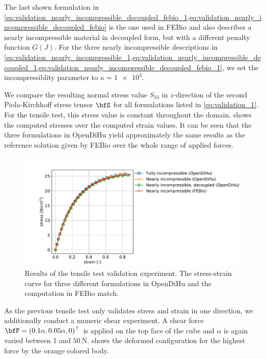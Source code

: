 The last shown formulation in \cref{eq:validation_nearly_incompressible_decoupled_febio_1,eq:validation_nearly_incompressible_decoupled_febio} is the one used in FEBio and also describes a nearly incompressible material in decoupled form, but with a different penalty function $G(J)$.  
For the three nearly incompressible descriptions in \cref{eq:validation_nearly_incompressible_1,eq:validation_nearly_incompressible_decoupled_1,eq:validation_nearly_incompressible_decoupled_febio_1}, we set the incompressiblity parameter to $\kappa=\num{1e3}$.

We compare the resulting normal stress value $S_{33}$ in $z$-direction of the second Piola-Kirchhoff stress tensor $\bfS$ for all formulations listed in \cref{eq:validation_1}. For the tensile test, this stress value is constant throughout the domain.  shows the computed stresses over the computed strain values.
It can be seen that the three formulations in OpenDiHu yield approximately the same results as the reference solution given by FEBio over the whole range of applied forces.

\begin{figure}
  \centering%
  \includegraphics[width=\textwidth]{images/results/basic/validation_tensile_test.pdf}%
  \caption{Results of the tensile test validation experiment. The stress-strain curve for three different formulations in OpenDiHu and the computation in FEBio match.}%
  \label{fig:validation_tensile_test}%
\end{figure}

As the previous tensile test only validates stress and strain in one direction, we additionally conduct a numeric shear experiment. A shear force $\bfF=(0.1\alpha, 0.05\alpha, 0)^\top$ is applied on the top face of the cube and $\alpha$ is again varied between 1 and $\SI{50}{\newton}$.  shows the deformed configuration for the highest force by the orange colored body.

